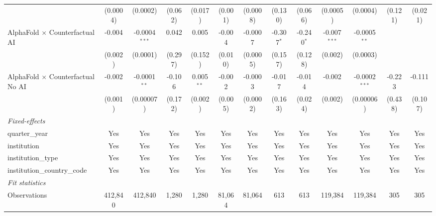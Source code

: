 \begin{tabular}{lcccccccccccc}
                                            & (0.0004)      & (0.0002)        & (0.062) & (0.017)       & (0.001)       & (0.0008)      & (0.130)      & (0.066)      & (0.0005)       & (0.0004)        & (0.121) & (0.021)\\   
   AlphaFold $\times$ Counterfactual AI     & -0.004        & -0.0004$^{***}$ & 0.042   & 0.005         & -0.004        & -0.0007       & -0.307$^{*}$ & -0.240$^{*}$ & -0.007$^{***}$ & -0.0005$^{**}$  &         &   \\   
                                            & (0.002)       & (0.0001)        & (0.297) & (0.152)       & (0.010)       & (0.0005)      & (0.157)      & (0.128)      & (0.002)        & (0.0003)        &         &   \\   
   AlphaFold $\times$ Counterfactual No AI  & -0.002        & -0.0001$^{**}$  & -0.106  & 0.005$^{**}$  & -0.002        & -0.0003       & -0.017       & -0.014       & -0.002         & -0.0002$^{***}$ & -0.223  & -0.111\\   
                                            & (0.001)       & (0.00007)       & (0.172) & (0.002)       & (0.005)       & (0.0002)      & (0.163)      & (0.024)      & (0.002)        & (0.00006)       & (0.438) & (0.107)\\   
   \midrule
   \emph{Fixed-effects}\\
   quarter\_year                            & Yes           & Yes             & Yes     & Yes           & Yes           & Yes           & Yes          & Yes          & Yes            & Yes             & Yes     & Yes\\  
   institution                              & Yes           & Yes             & Yes     & Yes           & Yes           & Yes           & Yes          & Yes          & Yes            & Yes             & Yes     & Yes\\  
   institution\_type                        & Yes           & Yes             & Yes     & Yes           & Yes           & Yes           & Yes          & Yes          & Yes            & Yes             & Yes     & Yes\\  
   institution\_country\_code               & Yes           & Yes             & Yes     & Yes           & Yes           & Yes           & Yes          & Yes          & Yes            & Yes             & Yes     & Yes\\  
   \midrule
   \emph{Fit statistics}\\
   Observations                             & 412,840       & 412,840         & 1,280   & 1,280         & 81,064        & 81,064        & 613          & 613          & 119,384        & 119,384         & 305     & 305\\  

\end{tabular}
